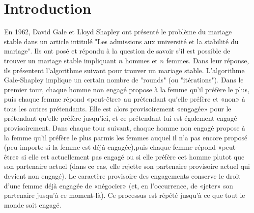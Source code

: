 \documentclass[11pt]{article}
\begin{document}
\maketitle

\tableofcontents

\newpage
\section{Introduction}
En 1962, David Gale et Lloyd Shapley ont pr\'esent\'e le probl\`eme du mariage
stable dans un article intitul\'e "Les admissions aux universit\'e et la
stabilit\'e du mariage".
Ils ont pos\'e et r\'epondu \`a la question de savoir s'il est possible de
trouver un mariage stable impliquant $n$ hommes et $n$ femmes.
Dans leur r\'eponse, ils pr\'esentent l'algorithme suivant pour
trouver un mariage stable.
L'algorithme Gale-Shapley implique un certain nombre de "rounds" (ou
"it\'erations"). Dans le premier tour, chaque homme non engag\'e propose 
\`a la femme qu'il pr\'ef\`ere le plus, puis chaque femme 
r\'epond «peut-être» au pr\'etendant qu'elle pr\'ef\`ere et «non» \`a tous
les autres pr\'etendants. Elle est alors provisoirement «engag\'ee» pour le
pr\'etendant qu'elle pr\'ef\`ere jusqu'ici, et ce pr\'etendant lui est
\'egalement engag\'e provisoirement.
Dans chaque tour suivant, chaque homme non engag\'e propose \`a la
femme qu'il pr\'ef\`ere le plus parmis les femmes auquel il n'a pas encore
propos\'e (peu importe si la femme est d\'ej\`a engag\'ee),puis chaque femme r\'epond «peut-être»
si elle est actuellement pas engag\'e ou si elle pr\'ef\`ere cet homme plutot
que son partenaire actuel (dans ce cas, elle rejette son partenaire provisoire actuel
qui devient non engag\'e).
Le caractère provisoire des engagements conserve le droit d'une femme d\'ej\`a
engag\'ee de «n\'egocier» (et, en l'occurrence, de «jeter» son partenaire
jusqu'\`a ce moment-l\`a).
Ce processus est r\'ep\'et\'e jusqu'\`a ce que tout le monde soit engag\'e.
\end{document}
